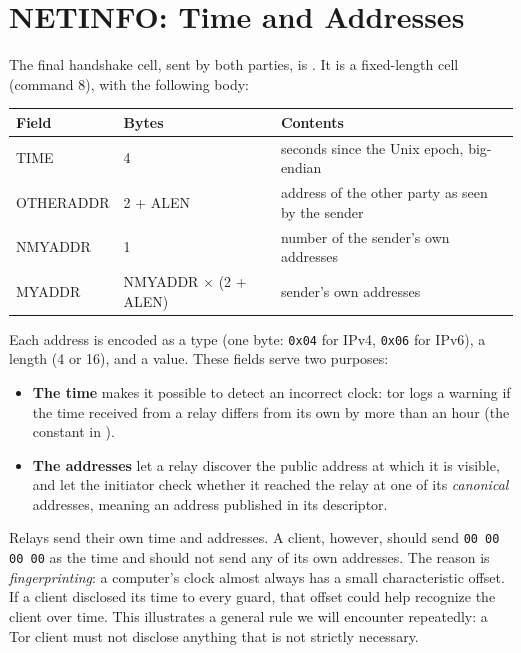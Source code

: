 \section{NETINFO: Time and Addresses}\label{sec:canale-netinfo}

The final handshake cell, sent by both parties, is . It is a fixed-length cell (command 8), with the following body:

\begin{center}
\begin{tabularx}{\textwidth}{@{}ll>{\raggedright\arraybackslash}X@{}}
\toprule
Field & Bytes & Contents \\
\midrule
TIME & 4 & seconds since the Unix epoch, big-endian \\
OTHERADDR & 2 + ALEN & address of the other party as seen by the sender \\
NMYADDR & 1 & number of the sender's own addresses \\
MYADDR & NMYADDR $\times$ (2 + ALEN) & sender's own addresses \\
\bottomrule
\end{tabularx}
\end{center}

Each address is encoded as a type (one byte: \texttt{0x04} for IPv4, \texttt{0x06} for IPv6), a length (4 or 16), and a value. These fields serve two purposes:
\begin{itemize}
  \item \textbf{The time} makes it possible to detect an incorrect clock: tor logs a warning if the time received from a relay differs from its own by more than an hour (the  constant in ).
  \item \textbf{The addresses} let a relay discover the public address at which it is visible, and let the initiator check whether it reached the relay at one of its \emph{canonical} addresses, meaning an address published in its descriptor.
\end{itemize}

\begin{attenzione}
Relays send their own time and addresses. A client, however, should send \texttt{00 00 00 00} as the time and should not send any of its own addresses. The reason is \emph{fingerprinting}: a computer's clock almost always has a small characteristic offset. If a client disclosed its time to every guard, that offset could help recognize the client over time. This illustrates a general rule we will encounter repeatedly: a Tor client must not disclose anything that is not strictly necessary.
\end{attenzione}

